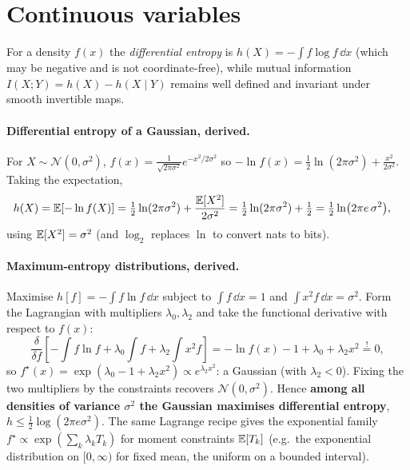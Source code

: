 \documentclass[11pt]{article}
\begin{document}
\section{Continuous variables}
For a density $f(x)$ the \emph{differential entropy} is $h(X)=-\int f\log f\,\dd x$ (which may be
negative and is not coordinate-free), while mutual information $I(X;Y)=h(X)-h(X\mid Y)$ remains
well defined and invariant under smooth invertible maps.

\paragraph{Differential entropy of a Gaussian, derived.}
For $X\sim\mathcal N(0,\sigma^2)$, $f(x)=\frac{1}{\sqrt{2\pi\sigma^2}}e^{-x^2/2\sigma^2}$ so
$-\ln f(x)=\tfrac12\ln(2\pi\sigma^2)+\tfrac{x^2}{2\sigma^2}$. Taking the expectation,
\begin{align}
  h(X)=\mathbb{E}[-\ln f(X)]
   &=\tfrac12\ln(2\pi\sigma^2)+\frac{\mathbb{E}[X^2]}{2\sigma^2}
    =\tfrac12\ln(2\pi\sigma^2)+\tfrac12
    =\tfrac12\ln\!\big(2\pi e\,\sigma^2\big),
\end{align}
using $\mathbb{E}[X^2]=\sigma^2$ (and $\log_2$ replaces $\ln$ to convert nats to bits).

\paragraph{Maximum-entropy distributions, derived.}
Maximise $h[f]=-\int f\ln f\,\dd x$ subject to $\int f\,\dd x=1$ and $\int x^2 f\,\dd x=\sigma^2$.
Form the Lagrangian with multipliers $\lambda_0,\lambda_2$ and take the functional derivative with
respect to $f(x)$:
\begin{equation}
  \frac{\delta}{\delta f}\!\left[-\!\int f\ln f
   +\lambda_0\!\int f+\lambda_2\!\int x^2 f\right]
  =-\ln f(x)-1+\lambda_0+\lambda_2 x^2 \overset{!}{=}0 ,
\end{equation}
so $f^\star(x)=\exp(\lambda_0-1+\lambda_2 x^2)\propto e^{\lambda_2 x^2}$: a Gaussian (with
$\lambda_2<0$). Fixing the two multipliers by the constraints recovers $\mathcal N(0,\sigma^2)$.
Hence \textbf{among all densities of variance $\sigma^2$ the Gaussian maximises differential
entropy}, $h\le\tfrac12\log(2\pi e\sigma^2)$. The same Lagrange recipe gives the exponential
family $f^\star\propto\exp(\sum_k\lambda_kT_k)$ for moment constraints $\mathbb{E}[T_k]$ (e.g.\ the
exponential distribution on $[0,\infty)$ for fixed mean, the uniform on a bounded interval).
\end{document}
